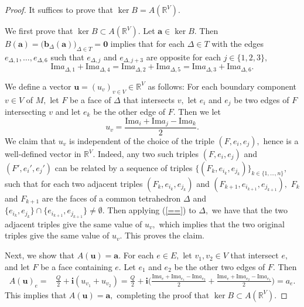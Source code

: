 \documentclass[11pt]{article}
\theoremstyle{remark}
\theoremstyle{remark}
\numberwithin{equation}{section}
\begin{document}
\begin{proof}
It suffices to prove that 
$\ker B = A(\mathbb R^V).$
\medskip

We first prove that $\ker B\subset A(\mathbb R^V).$ Let $\boldsymbol a\in \ker B.$ Then $B(\boldsymbol a)=\big(\boldsymbol b_\Delta(\boldsymbol a)\big)_{\Delta\in T}=\boldsymbol 0$ implies that 
for each $\Delta\in T$ with the edges $e_{\Delta,1},\dots,e_{\Delta,6}$ such that $e_{\Delta,j}$ and $e_{\Delta,j+3}$ are opposite for each $j\in\{1,2,3\},$
\begin{equation}\label{==}
\mathrm{Im}a_{\Delta,1}+ \mathrm{Im}a_{\Delta,4}= \mathrm{Im}a_{\Delta,2}+ \mathrm{Im}a_{\Delta,5}= \mathrm{Im}a_{\Delta,3}+ \mathrm{Im}a_{\Delta,6}.   
\end{equation}

We define a vector $\boldsymbol u=(u_v)_{v\in V}\in\mathbb R^V$ as follows: For each boundary component $v\in V$ of $M,$ let $F$ be a face of $\Delta$ that intersects $v,$ let $e_i$ and $e_j$ be two edges of $F$ intersecting $v$ and let $e_k$ be the other edge of $F.$ Then we let 
$$u_v=\frac{\mathrm{Im}a_i+\mathrm{Im}a_j-\mathrm{Im}a_k}{2}.$$
We claim that $u_v$ is independent of the choice of the triple $(F,e_i,e_j),$ hence is a  well-defined vector in $\mathbb R^V.$  Indeed, any two such triples $(F,e_i,e_j)$ and $(F',e_i',e_j')$ can be related by a sequence of triples $\{(F_k,e_{i_k},e_{j_k})\}_{k\in\{1,\dots,n\}},$ such that for each two adjacent triples $(F_k,e_{i_k},e_{j_k})$ and $(F_{k+1},e_{i_{k+1}},e_{j_{k+1}}),$ $F_k$ and $F_{k+1}$ are the faces of a common tetrahedron $\Delta$ and $\{e_{i_k},e_{j_k}\}\cap \{e_{i_{k+1}},e_{j_{k+1}}\}\neq \emptyset.$ Then applying (\ref{==}) to $\Delta,$ we have that the two adjacent triples give the same value of $u_v,$ which implies that the two original triples give the same value of $u_v.$ This proves the claim.

Next, we show that $A(\boldsymbol u)=\boldsymbol a.$ For each $e\in E,$ let $v_1, v_2\in V$ that intersect $e,$ and let $F$ be a face containing $e.$ Let $e_1$ and $e_2$ be the other two edges of $F.$ 
Then
\begin{equation*}
\begin{split}
A(\boldsymbol u)_e= & \frac{Q}{2}+ \mathbf i (u_{v_1}+u_{v_2}) 
 = \frac{Q}{2}+ \mathbf i \bigg( \frac{\mathrm{Im}a_e+\mathrm{Im}a_{e_1}-\mathrm{Im}a_{e_2}}{2}+  \frac{\mathrm{Im}a_e+\mathrm{Im}a_{e_2}-\mathrm{Im}a_{e_1}}{2} \bigg) = a_e. 
\end{split}
\end{equation*}
This implies that $A(\boldsymbol u)=\boldsymbol a,$
completing the proof that  $\ker B\subset A(\mathbb R^V).$ 
\medskip



\end{proof}
\end{document}
